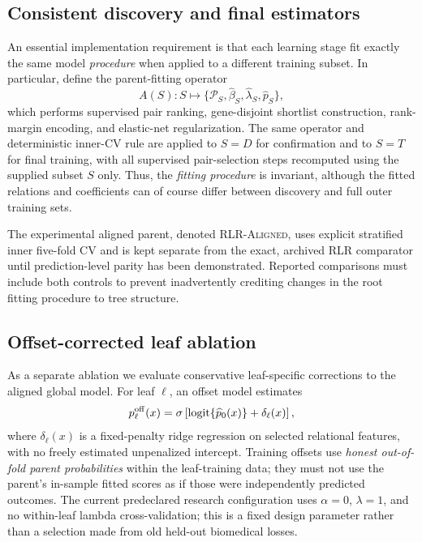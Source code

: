 \subsection{Consistent discovery and final estimators}
\label{sec:rlmt_alignment}

An essential implementation requirement is that each learning
stage fit exactly the same model \emph{procedure} when applied
to a different training subset. In particular, define the
parent-fitting operator
\begin{equation}
 A(S): S\mapsto\{
   \mathcal P_S,\widehat\beta_S,
   \widehat\lambda_S,\widehat p_S\},
 \label{eq:rlmt_fit_operator}
\end{equation}
which performs supervised pair ranking, gene-disjoint shortlist
construction, rank-margin encoding, and elastic-net
regularization. The same operator and deterministic inner-CV
rule are applied to $S=D$ for confirmation and to $S=T$ for
final training, with all supervised pair-selection steps
recomputed using the supplied subset $S$ only.
Thus, the \emph{fitting procedure} is invariant, although
the fitted relations and coefficients can of course differ
between discovery and full outer training sets.

The experimental aligned parent, denoted
\textsc{RLR-Aligned}, uses explicit stratified inner
five-fold CV and is kept separate from the exact,
archived RLR comparator until prediction-level parity
has been demonstrated. Reported comparisons must include
both controls to prevent inadvertently crediting changes
in the root fitting procedure to tree structure.

\subsection{Offset-corrected leaf ablation}
\label{sec:rlmt_offset}

As a separate ablation we evaluate conservative
leaf-specific corrections to the aligned global model.
For leaf $\ell$, an offset model estimates
\begin{equation}
  p^{\rm off}_{\ell}(x)=
  \sigma\left[
    \operatorname{logit}\{\widehat p_0(x)\}
    +\delta_{\ell}(x)
  \right],
  \label{eq:rlmt_offset}
\end{equation}
where $\delta_{\ell}(x)$ is a fixed-penalty ridge regression
on selected relational features, with no freely estimated
unpenalized intercept. Training offsets use \emph{honest
out-of-fold parent probabilities} within the leaf-training
data; they must not use the parent's in-sample fitted scores
as if those were independently predicted outcomes. The
current predeclared research configuration uses
$\alpha=0$, $\lambda=1$, and no within-leaf lambda
cross-validation; this is a fixed design parameter rather
than a selection made from old held-out biomedical losses.

